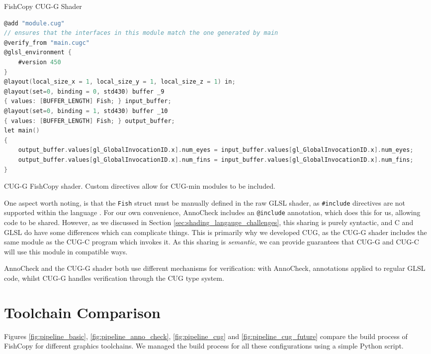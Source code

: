 \documentclass[a4paper,12pt,twoside,openright]{report}
\begin{document}
\begin{lstfloat}
\begin{center}
FishCopy CUG-G Shader
\end{center}
\begin{lstlisting}[language=C]
@add "module.cug"
// ensures that the interfaces in this module match the one generated by main
@verify_from "main.cugc"
@glsl_environment {
    #version 450
}
@layout(local_size_x = 1, local_size_y = 1, local_size_z = 1) in;
@layout(set=0, binding = 0, std430) buffer _9
{ values: [BUFFER_LENGTH] Fish; } input_buffer;
@layout(set=0, binding = 1, std430) buffer _10
{ values: [BUFFER_LENGTH] Fish; } output_buffer;
let main()
{
    output_buffer.values[gl_GlobalInvocationID.x].num_eyes = input_buffer.values[gl_GlobalInvocationID.x].num_eyes;
    output_buffer.values[gl_GlobalInvocationID.x].num_fins = input_buffer.values[gl_GlobalInvocationID.x].num_fins;
}
\end{lstlisting}
\caption{CUG-G FishCopy shader. Custom directives allow for CUG-min modules to
be included. }
\label{lst:cug_g_shader}
\end{lstfloat}

One aspect worth noting, is that the \texttt{Fish} struct must be manually
defined in the raw GLSL shader, as \texttt{\#include} directives are not
supported within the language \cite{NoIncludeGLSL}. For our own convenience,
AnnoCheck includes an \texttt{@include} annotation, which does this for us,
allowing code to be shared. However, as we discussed in Section
\ref{sec:shading_langauge_challenges}, this sharing is purely syntactic, and C
and GLSL do have some differences which can complicate things. This is
primarily why we developed CUG, as the CUG-G shader includes the same module as
the CUG-C program which invokes it. As this sharing is \textit{semantic}, we
can provide guarantees that CUG-G and CUG-C will use this module in compatible
ways.

AnnoCheck and the CUG-G shader both use different mechanisms for verification:
with AnnoCheck, annotations applied to regular GLSL code, whilst CUG-G handles
verification through the CUG type system.

\section{Toolchain Comparison}

\label{sec:toolchain_comparison}

Figures \ref{fig:pipeline_basic}, \ref{fig:pipeline_anno_check},
\ref{fig:pipeline_cug} and \ref{fig:pipeline_cug_future} compare the build
process of FishCopy for different graphics toolchains. We managed the build
process for all these configurations using a simple Python script.
\end{document}
